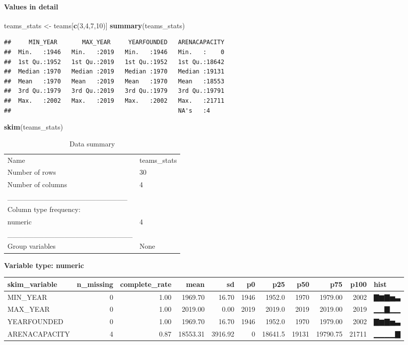 \documentclass[
]{article}
\newenvironment{Shaded}{\begin{snugshade}}{\end{snugshade}}
\newcommand{\DecValTok}[1]{\textcolor[rgb]{0.00,0.00,0.81}{#1}}
\newcommand{\KeywordTok}[1]{\textcolor[rgb]{0.13,0.29,0.53}{\textbf{#1}}}
\newcommand{\NormalTok}[1]{#1}
\newcommand{\StringTok}[1]{\textcolor[rgb]{0.31,0.60,0.02}{#1}}
\begin{document}
\hypertarget{values-in-detail-3}{%
\paragraph{Values in detail}\label{values-in-detail-3}}

\begin{Shaded}
\begin{Highlighting}[]
\NormalTok{teams\_stats \textless{}{-}}\StringTok{ }\NormalTok{teams[}\KeywordTok{c}\NormalTok{(}\DecValTok{3}\NormalTok{,}\DecValTok{4}\NormalTok{,}\DecValTok{7}\NormalTok{,}\DecValTok{10}\NormalTok{)]}
\KeywordTok{summary}\NormalTok{(teams\_stats)}
\end{Highlighting}
\end{Shaded}

\begin{verbatim}
##     MIN_YEAR       MAX_YEAR     YEARFOUNDED   ARENACAPACITY  
##  Min.   :1946   Min.   :2019   Min.   :1946   Min.   :    0  
##  1st Qu.:1952   1st Qu.:2019   1st Qu.:1952   1st Qu.:18642  
##  Median :1970   Median :2019   Median :1970   Median :19131  
##  Mean   :1970   Mean   :2019   Mean   :1970   Mean   :18553  
##  3rd Qu.:1979   3rd Qu.:2019   3rd Qu.:1979   3rd Qu.:19791  
##  Max.   :2002   Max.   :2019   Max.   :2002   Max.   :21711  
##                                               NA's   :4
\end{verbatim}

\begin{Shaded}
\begin{Highlighting}[]
\KeywordTok{skim}\NormalTok{(teams\_stats)}
\end{Highlighting}
\end{Shaded}

\begin{longtable}[]{@{}ll@{}}
\caption{Data summary}\tabularnewline
\toprule
\endhead
Name & teams\_stats\tabularnewline
Number of rows & 30\tabularnewline
Number of columns & 4\tabularnewline
\_\_\_\_\_\_\_\_\_\_\_\_\_\_\_\_\_\_\_\_\_\_\_ &\tabularnewline
Column type frequency: &\tabularnewline
numeric & 4\tabularnewline
\_\_\_\_\_\_\_\_\_\_\_\_\_\_\_\_\_\_\_\_\_\_\_\_ &\tabularnewline
Group variables & None\tabularnewline
\bottomrule
\end{longtable}

\textbf{Variable type: numeric}

\begin{longtable}[]{@{}lrrrrrrrrrl@{}}
\toprule
skim\_variable & n\_missing & complete\_rate & mean & sd & p0 & p25 &
p50 & p75 & p100 & hist\tabularnewline
\midrule
\endhead
MIN\_YEAR & 0 & 1.00 & 1969.70 & 16.70 & 1946 & 1952.0 & 1970 & 1979.00
& 2002 & ▇▆▇▅▃\tabularnewline
MAX\_YEAR & 0 & 1.00 & 2019.00 & 0.00 & 2019 & 2019.0 & 2019 & 2019.00 &
2019 & ▁▁▇▁▁\tabularnewline
YEARFOUNDED & 0 & 1.00 & 1969.70 & 16.70 & 1946 & 1952.0 & 1970 &
1979.00 & 2002 & ▇▆▇▅▃\tabularnewline
ARENACAPACITY & 4 & 0.87 & 18553.31 & 3916.92 & 0 & 18641.5 & 19131 &
19790.75 & 21711 & ▁▁▁▁▇\tabularnewline
\bottomrule
\end{longtable}
\end{document}

